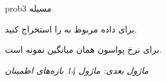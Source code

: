 \begin{PSbox}[unbreakable]{prob}{مسیله 3}

برای داده  مربوط به \lr{$\lambda$} را استخراج کنید.

\PSsolution{} \PSbr{}\PSbr{} برای نرخ پواسون همان میانگین نمونه است.

\emph{ماژول بعدی: {ماژول 14  بازه‌های اطمینان}}

\end{PSbox}
